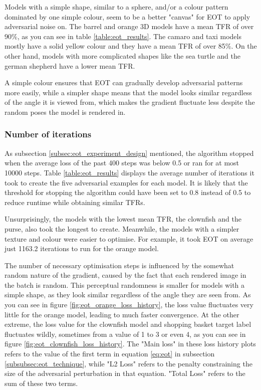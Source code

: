 Models with a simple shape, similar to a sphere, and/or a colour pattern dominated by one simple colour, seem to be a better "canvas" for EOT to apply adversarial noise on. The barrel and orange 3D models have a mean TFR of over 90\%, as you can see in table \ref{table:eot_results}. The camaro and taxi models mostly have a solid yellow colour and they have a mean TFR of over 85\%. On the other hand, models with more complicated shapes like the sea turtle and the german shepherd have a lower mean TFR. 

A simple colour ensures that EOT can gradually develop adversarial patterns more easily, while a simpler shape means that the model looks similar regardless of the angle it is viewed from, which makes the gradient fluctuate less despite the random poses the model is rendered in.

\subsubsection{Number of iterations}

As subsection \ref{subsec:eot_experiment_design} mentioned, the algorithm stopped when the average loss of the past 400 steps was below 0.5 or ran for at most 10000 steps. Table \ref{table:eot_results} displays the average number of iterations it took to create the five adversarial examples for each model. It is likely that the threshold for stopping the algorithm could have been set to 0.8 instead of 0.5 to reduce runtime while obtaining similar TFRs.

Unsurprisingly, the models with the lowest mean TFR, the clownfish and the purse, also took the longest to create. Meanwhile, the models with a simpler texture and colour were easier to optimise. For example, it took EOT on average just 1163.2 iterations to run for the orange model. 

The number of necessary optimisation steps is influenced by the somewhat random nature of the gradient, caused by the fact that each rendered image in the batch is random. This perceptual randomness is smaller for models with a simple shape, as they look similar regardless of the angle they are seen from. As you can see in figure \ref{fig:eot_orange_loss_history}, the loss value fluctuates very little for the orange model, leading to much faster convergence. At the other extreme, the loss value for the clownfish model and shopping basket target label fluctuates wildly, sometimes from a value of 1 to 3 or even 4, as you can see in figure \ref{fig:eot_clownfish_loss_history}. The "Main loss" in these loss history plots refers to the value of the first term in equation \ref{eq:eot} in subsection \ref{subsubsec:eot_technique}, while "L2 Loss" refers to the penalty constraining the size of the adversarial perturbation in that equation. "Total Loss" refers to the sum of these two terms.

